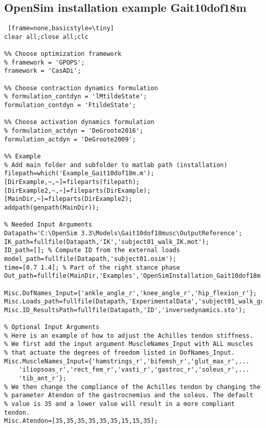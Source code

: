 \documentclass[a4paper,oneside,11pt]{article}
\begin{document}
\subsection{OpenSim installation example Gait10dof18m}
\label{Example Gait10dof18m}

\begin{lstlisting} [frame=none,basicstyle=\tiny]
clear all;close all;clc

%% Choose optimization framework
% framework = 'GPOPS';
framework = 'CasADi';

%% Choose contraction dynamics formulation
% formulation_contdyn = 'lMtildeState';
formulation_contdyn = 'FtildeState';

%% Choose activation dynamics formulation
% formulation_actdyn = 'DeGroote2016';
formulation_actdyn = 'DeGroote2009';

%% Example
% Add main folder and subfolder to matlab path (installation)
filepath=which('Example_Gait10dof18m.m'); 
[DirExample,~,~]=fileparts(filepath); 
[DirExample2,~,~]=fileparts(DirExample); 
[MainDir,~]=fileparts(DirExample2);
addpath(genpath(MainDir));

% Needed Input Arguments
Datapath='C:\OpenSim 3.3\Models\Gait10dof18musc\OutputReference';
IK_path=fullfile(Datapath,'IK','subject01_walk_IK.mot');
ID_path=[]; % Compute ID from the external loads
model_path=fullfile(Datapath,'subject01.osim');
time=[0.7 1.4]; % Part of the right stance phase
Out_path=fullfile(MainDir,'Examples','OpenSimInstallation_Gait10dof18m','Results');

Misc.DofNames_Input={'ankle_angle_r','knee_angle_r','hip_flexion_r'};
Misc.Loads_path=fullfile(Datapath,'ExperimentalData','subject01_walk_grf.xml');
Misc.ID_ResultsPath=fullfile(Datapath,'ID','inversedynamics.sto');

% Optional Input Arguments
% Here is an example of how to adjust the Achilles tendon stiffness.
% We first add the input argument MuscleNames_Input with ALL muscles 
% that actuate the degrees of freedom listed in DofNames_Input.
Misc.MuscleNames_Input={'hamstrings_r','bifemsh_r','glut_max_r',...
    'iliopsoas_r','rect_fem_r','vasti_r','gastroc_r','soleus_r',...
    'tib_ant_r'}; 
% We then change the compliance of the Achilles tendon by changing the 
% parameter Atendon of the gastrocnemius and the soleus. The default 
% value is 35 and a lower value will result in a more compliant tendon.
Misc.Atendon=[35,35,35,35,35,35,15,15,35];


\end{lstlisting}
\end{document}
